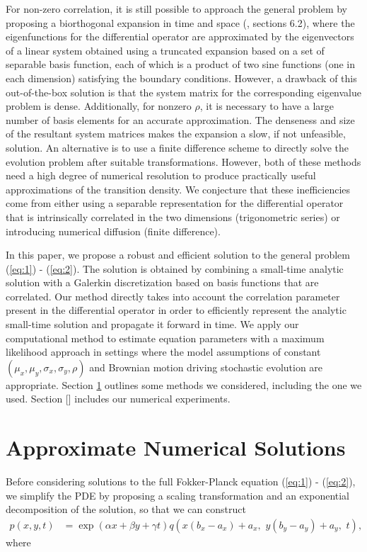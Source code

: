 \documentclass[10pt]{article}
\begin{document}
For non-zero correlation, it is still possible to approach the general
problem by proposing a biorthogonal expansion in time and space
(\cite{risken1989fokker-planck}, sections 6.2), where the
eigenfunctions for the differential operator are approximated
 by the
eigenvectors of a linear system obtained using a truncated expansion
based on a set of separable basis function, each of which is a product
of two sine functions (one in each dimension) satisfying the boundary
conditions. However, a drawback of this out-of-the-box solution is
that the system matrix for the corresponding eigenvalue problem is
dense. Additionally, for nonzero $\rho$, it is necessary to have a
large number of basis elements for an accurate approximation. The
denseness and size of the resultant system matrices makes the
expansion a slow, if not unfeasible, solution. An alternative is to
use a finite difference scheme to directly solve the evolution problem
after suitable transformations. However, both of these methods need a
high degree of numerical resolution to produce practically useful
approximations of the transition density. We conjecture that these
inefficiencies come from either using a separable representation for
the differential operator that is intrinsically correlated in the two
dimensions (trigonometric series) or introducing numerical
diffusion (finite difference).

In this paper, we propose a robust and efficient solution to the
general problem (\ref{eq:1}) - (\ref{eq:2}). The solution is obtained
by combining a small-time analytic solution with a Galerkin
discretization based on basis functions that are correlated. Our
method directly takes into account the correlation parameter present
in the differential operator in order to efficiently represent the
analytic small-time solution and propagate it forward in time. We
apply our computational method to estimate equation parameters with a
maximum likelihood approach in settings where the model assumptions of
constant $(\mu_x, \mu_y, \sigma_x, \sigma_y, \rho)$ and Brownian
motion driving stochastic evolution are appropriate. Section
\ref{sec:approximate-sols} outlines some methods we considered,
including the one we used. Section [] includes our numerical
experiments.


\section{Approximate Numerical Solutions} \label{sec:approximate-sols}
Before considering solutions to the full Fokker-Planck equation
(\ref{eq:1}) - (\ref{eq:2}), we simplify the PDE by proposing a
scaling transformation and an exponential decomposition of the
solution, so that we can construct
\begin{align}
  p(x,y,t) &= \exp(\alpha x + \beta y + \gamma t) q\left( x(b_x - a_x) + a_x, \,\, y(b_y - a_y) + a_y, \,\, t \right), \label{eq:q-to-p}
\end{align}
where
\end{document}
